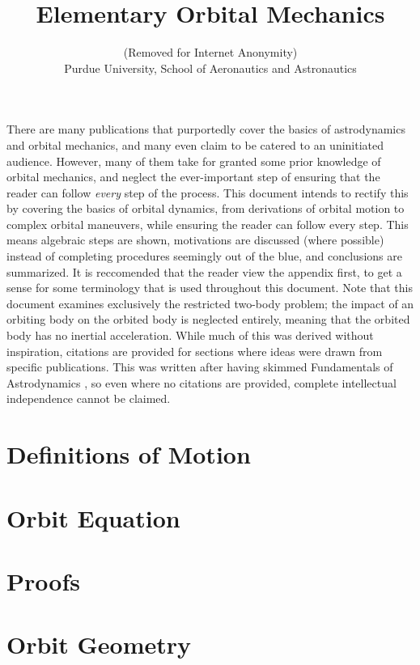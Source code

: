 \documentclass{article}
\title{Elementary Orbital Mechanics}
\author{(Removed for Internet Anonymity)\\Purdue University, School of Aeronautics and Astronautics}
\date{}
\begin{document}
\maketitle

There are many publications that purportedly cover the basics of astrodynamics and orbital mechanics, and many even claim to be catered to an uninitiated audience. However, many of them take for granted some prior knowledge of orbital mechanics, and neglect the ever-important step of ensuring that the reader can follow \textit{every} step of the process. This document intends to rectify this by covering the basics of orbital dynamics, from derivations of orbital motion to complex orbital maneuvers, while ensuring the reader can follow every step. This means algebraic steps are shown, motivations are discussed (where possible) instead of completing procedures seemingly out of the blue, and conclusions are summarized. It is reccomended that the reader view the appendix first, to get a sense for some terminology that is used throughout this document. Note that this document examines exclusively the restricted two-body problem; the impact of an orbiting body on the orbited body is neglected entirely, meaning that the orbited body has no inertial acceleration. While much of this was derived without inspiration, citations are provided for sections where ideas were drawn from specific publications. This was written after having skimmed Fundamentals of Astrodynamics \cite{Bate_Mueller_White_1971}, so even where no citations are provided, complete intellectual independence cannot be claimed.

\pagebreak
\tableofcontents

\pagebreak
\section{Definitions of Motion}\label{Sec:Motion}


\pagebreak
\section{Orbit Equation}\label{Sec:Orbit Equation}


\pagebreak
\section{Proofs}\label{sec:Proofs}


\pagebreak
\section{Orbit Geometry}\label{sec:Orbit Geometry}

\end{document}
